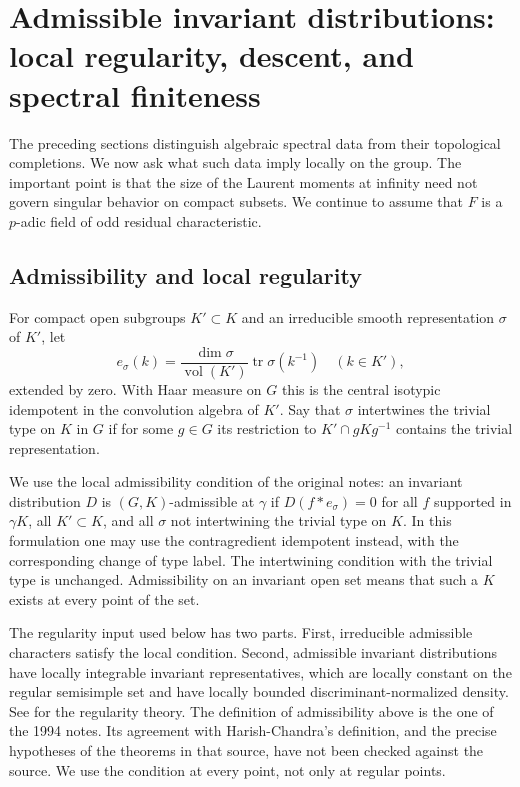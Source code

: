 \section{Admissible invariant distributions: local regularity, descent, and spectral finiteness}\label{sec:descent}
The preceding sections distinguish algebraic spectral data from their topological completions. We now ask what such data imply locally on the group. The important point is that the size of the Laurent moments at infinity need not govern singular behavior on compact subsets. We continue to assume that $F$ is a $p$-adic field of odd residual characteristic.

\subsection{Admissibility and local regularity}
For compact open subgroups $K'\subset K$ and an irreducible smooth representation $\sigma$ of $K'$, let
\[
e_\sigma(k)=\frac{\dim\sigma}{\operatorname{vol}(K')}
 \operatorname{tr}\sigma(k^{-1})\quad(k\in K'),
\]
extended by zero. With Haar measure on $G$ this is the central isotypic idempotent in the convolution algebra of $K'$. Say that $\sigma$ intertwines the trivial type on $K$ in $G$ if for some $g\in G$ its restriction to $K'\cap gKg^{-1}$ contains the trivial representation.

We use the local admissibility condition of the original notes: an invariant distribution $D$ is $(G,K)$-admissible at $\gamma$ if $D(f*e_\sigma)=0$ for all $f$ supported in $\gamma K$, all $K'\subset K$, and all $\sigma$ not intertwining the trivial type on $K$. In this formulation one may use the contragredient idempotent instead, with the corresponding change of type label. The intertwining condition with the trivial type is unchanged. Admissibility on an invariant open set means that such a $K$ exists at every point of the set.

\begin{remark}\label{rem:hc-input}
The regularity input used below has two parts. First, irreducible admissible characters satisfy the local condition. Second, admissible invariant distributions have locally integrable invariant representatives, which are locally constant on the regular semisimple set and have locally bounded discriminant-normalized density. See \cite{HC99} for the regularity theory. The definition of admissibility above is the one of the 1994 notes. Its agreement with Harish-Chandra's definition, and the precise hypotheses of the theorems in that source, have not been checked against the source. We use the condition at every point, not only at regular points.
\end{remark}

